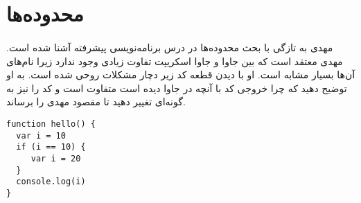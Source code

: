 \documentclass[../main.tex]{subfiles}
\begin{document}
\section{محدوده‌ها}

\paragraph{}
مهدی به تازگی با بحث محدوده‌ها
در درس برنامه‌نویسی پیشرفته آشنا شده است.
مهدی معتقد است که بین جاوا و جاوا اسکریپت تفاوت زیادی وجود ندارد زیرا نام‌های آن‌ها بسیار مشابه است.
او با دیدن قطعه کد زیر دچار مشکلات روحی شده است.
به او توضیح دهید که چرا خروجی کد با آنچه در جاوا دیده است متفاوت است
و کد را نیز به گونه‌ای تغییر دهید تا مقصود مهدی را برساند.

\begin{latin}
\begin{verbatim}
function hello() {
  var i = 10
  if (i == 10) {
     var i = 20
  }
  console.log(i)
}
\end{verbatim}
\end{latin}
\end{document}
